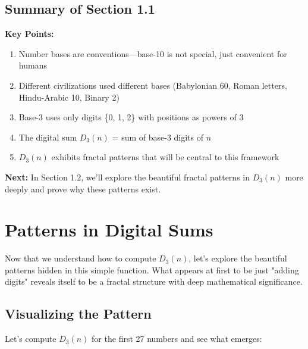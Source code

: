 \subsection{Summary of Section 1.1}

\textbf{Key Points:}
\begin{enumerate}
\item Number bases are conventions—base-10 is not special, just convenient for humans
\item Different civilizations used different bases (Babylonian 60, Roman letters, Hindu-Arabic 10, Binary 2)
\item Base-3 uses only digits \{0, 1, 2\} with positions as powers of 3
\item The digital sum $D_3(n)$ = sum of base-3 digits of $n$
\item $D_3(n)$ exhibits fractal patterns that will be central to this framework
\end{enumerate}

\textbf{Next:} In Section 1.2, we'll explore the beautiful fractal patterns in $D_3(n)$ more deeply and prove why these patterns exist.


\section{Patterns in Digital Sums}
\label{sec:digital-sum-patterns}

Now that we understand how to compute $D_3(n)$, let's explore the beautiful patterns hidden in this simple function. What appears at first to be just "adding digits" reveals itself to be a fractal structure with deep mathematical significance.

\subsection{Visualizing the Pattern}
\label{subsec:visualizing-pattern}


Let's compute $D_3(n)$ for the first 27 numbers and see what emerges:

